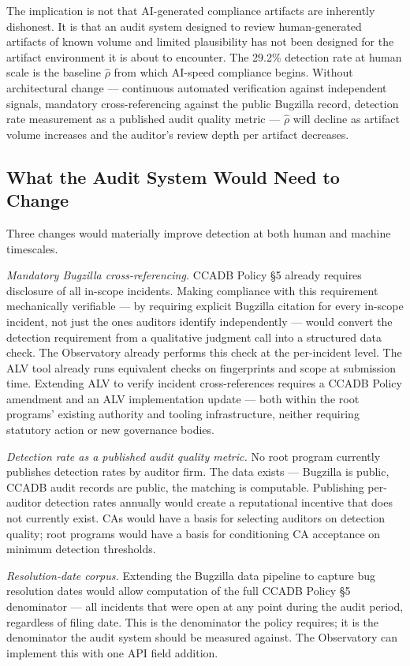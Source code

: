 \documentclass[10pt,twocolumn,letterpaper]{article}
\begin{document}
The implication is not that AI-generated compliance artifacts are
inherently dishonest. It is that an audit system designed to review
human-generated artifacts of known volume and limited plausibility has
not been designed for the artifact environment it is about to encounter.
The 29.2\% detection rate at human scale is the baseline $\hat{\rho}$
from which AI-speed compliance begins. Without architectural change ---
continuous automated verification against independent signals, mandatory
cross-referencing against the public Bugzilla record, detection rate
measurement as a published audit quality metric --- $\hat{\rho}$ will
decline as artifact volume increases and the auditor's review
depth per artifact decreases.

\subsection{What the Audit System Would Need to Change}
\label{sec:remedies}

Three changes would materially improve detection at both human and
machine timescales.

\textit{Mandatory Bugzilla cross-referencing.} CCADB Policy \S5 already
requires disclosure of all in-scope incidents. Making compliance
with this requirement mechanically verifiable --- by requiring explicit
Bugzilla citation for every in-scope incident, not just the ones
auditors identify independently --- would convert the detection
requirement from a qualitative judgment call into a structured data
check. The Observatory already performs this check at the per-incident
level. The ALV tool already runs equivalent checks on fingerprints and
scope at submission time. Extending ALV to verify incident
cross-references requires a CCADB Policy amendment and an ALV
implementation update --- both within the root programs' existing
authority and tooling infrastructure, neither requiring statutory action
or new governance bodies.

\textit{Detection rate as a published audit quality metric.} No root
program currently publishes detection rates by auditor firm. The data
exists --- Bugzilla is public, CCADB audit records are public, the
matching is computable. Publishing per-auditor detection rates
annually would create a reputational incentive that does not currently
exist. CAs would have a basis for selecting auditors on detection
quality; root programs would have a basis for conditioning CA
acceptance on minimum detection thresholds.

\textit{Resolution-date corpus.} Extending the Bugzilla data pipeline
to capture bug resolution dates would allow computation of the full
CCADB Policy \S5 denominator --- all incidents that were open at any
point during the audit period, regardless of filing date. This is
the denominator the policy requires; it is the denominator the audit
system should be measured against. The Observatory can implement this
with one API field addition.
\end{document}
